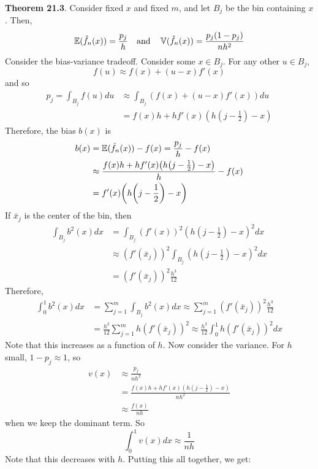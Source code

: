 \textbf{Theorem 21.3}. Consider fixed \(x\) and fixed \(m\), and let \(B_{j}\) be the bin containing \(x\). Then,
\[
\operatorname{\mathbb{E}}(\hat{f}_{n}(x)) = \frac{p_{j}}{h} 
\quad \text{and} \quad
\operatorname{\mathbb{V}}(\hat{f}_{n}(x)) = \frac{p_{j} (1 - p_{j})}{nh^{2}}
\]
Consider the bias-variance tradeoff. Consider some
\(x \in B_{j}\). For any other \(u \in B_{j}\),
\[
f(u) \approx f(x) + (u - x) f'(x)
\]
and so
\begin{align*}
p_{j} = \int_{B_{j}} f(u) du &\approx \int_{B_{j}} (f(x) + (u - x) f'(x)) du \\
&= f(x) h + h f'(x) \left(h \left(j - \frac{1}{2} \right) - x \right)
\end{align*}
Therefore, the bias \(b(x)\) is
\begin{align*}
b(x) &= \EXP(\hat{f}_{n}(x)) - f(x) = \frac{p_{j}}{h} - f(x) \\
&\approx \frac{f(x) h + h f'(x) \left(h \left(j - \frac{1}{2} \right) - x \right)}{h} - f(x) \\
&= f'(x) \left(h \left(j - \frac{1}{2} \right) - x \right)
\end{align*}
If \(\bar{x}_{j}\) is the center of the bin, then
\begin{align*}
\int_{B_{j}} b^{2}(x) dx &= \int_{B_{j}} (f'(x))^{2} \left(h \left(j - \frac{1}{2} \right) - x \right)^{2} dx \\
&\approx (f'(\bar{x}_{j}))^{2} \int_{B_{j}} \left(h \left(j - \frac{1}{2} \right) - x \right)^{2} dx \\
&= (f'(\bar{x}_{j}))^{2} \frac{h^{3}}{12}
\end{align*}
Therefore,
\begin{align*}
\int_{0}^{1} b^{2}(x) dx &= \sum_{j=1}^m \int_{B_{j}} b^{2}(x) dx \approx \sum_{j=1}^m (f'(\bar{x}_{j}))^{2} \frac{h^{3}}{12} \\
&= \frac{h^{2}}{12} \sum_{j=1}^m h(f'(\bar{x}_{j}))^{2} \approx \frac{h^{2}}{12} \int_{0}^{1} h(f'(\bar{x}_{j}))^{2} dx
\end{align*}
Note that this increases as a function of \(h\).
Now consider the variance. For \(h\) small, \(1 - p_{j} \approx 1\), so
\begin{align*}
v(x) &\approx \frac{p_{j}}{nh^{2}}\\
&= \frac{f(x)h + h f'(x)\left(h \left(j - \frac{1}{2} \right) - x \right)}{nh^{2}} \\
&\approx \frac{f(x)}{nh}
\end{align*}
when we keep the dominant term. So
\[
\int_{0}^{1} v(x) dx \approx \frac{1}{nh}
\]
Note that this decreases with \(h\). Putting this all together, we get:

